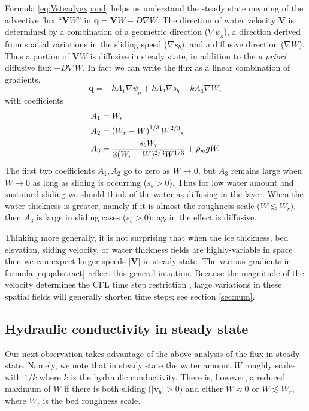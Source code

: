 \documentclass[gmd]{copernicus}   %
\newcommand\bv{\mathbf{v}}
\newcommand\bV{\mathbf{V}}
\newcommand\bq{\mathbf{q}}
\newcommand{\grad}{\nabla}
\begin{document}
Formula \eqref{eq:Vsteadyexpand} helps us understand the steady state meaning of the advective flux ``$\bV W$'' in $\bq=\bV W - D \grad W$.  The direction of water velocity $\bV$ is determined by a combination of a geometric direction ($\grad \psi_o$), a direction derived from spatial variations in the sliding speed ($\grad s_b$), and a diffusive direction ($\grad W$).  Thus a portion of $\bV W$ is diffusive in steady state, in addition to the \emph{a priori} diffusive flux $- D \grad W$.  In fact we can write the flux as a linear combination of gradients,
\begin{equation}
\bq = - k A_1 \grad \psi_o + k A_2 \grad s_b - k A_3 \grad W,  \label{eq:qabstract}
\end{equation}
with coefficients
\begin{align}
&A_1 = W, \label{eq:qcoefficient} \\
&A_2 = \left(W_r - W\right)^{1/3} W^{2/3}, \notag \\
&A_3 = \frac{s_b W_r}{3 (W_r - W)^{2/3} W^{1/3}} + \rho_w g W. \notag
\end{align}
The first two coefficients $A_1,A_2$ go to zero as $W\to 0$, but $A_3$ remains large when $W\to 0$ as long as sliding is occurring ($s_b > 0$).  Thus for low water amount and sustained sliding we should think of the water as diffusing in the layer.  When the water thickness is greater, namely if it is almost the roughness scale ($W\lesssim W_r$), then $A_3$ is large in sliding cases ($s_b>0$); again the effect is diffusive.

Thinking more generally, it is not surprising that when the ice thickness, bed elevation, sliding velocity, or water thickness fields are highly-variable in space then we can expect larger speeds $|\bV|$ in steady state.  The various gradients in formula \eqref{eq:qabstract} reflect this general intuition.  Because the magnitude of the velocity determines the CFL time step restriction \citep{MortonMayers}, large variations in these spatial fields will generally shorten time steps; see section \ref{sec:num}.


\subsection{Hydraulic conductivity in steady state}  Our next observation takes advantage of the above analysis of the flux in steady state.  Namely, we note that in steady state the water amount $W$ roughly scales with $1/k$ where $k$ is the hydraulic conductivity.  There is, however, a reduced maximum of $W$ if there is both sliding ($|\bv_b|>0$) and either $W\approx 0$ or $W\lesssim W_r$, where $W_r$ is the bed roughness scale.
\end{document}
